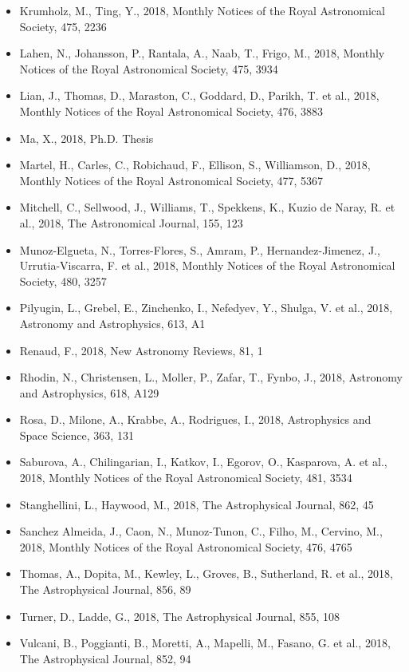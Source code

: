 \documentclass{letter}
\begin{document}
\begin{enumerate}
\begin{itemize}
\item Krumholz, M., Ting, Y., 2018, Monthly Notices of the Royal Astronomical Society, 475, 2236
\item Lahen, N., Johansson, P., Rantala, A., Naab, T., Frigo, M., 2018, Monthly Notices of the Royal Astronomical Society, 475, 3934
\item Lian, J., Thomas, D., Maraston, C., Goddard, D., Parikh, T. et al., 2018, Monthly Notices of the Royal Astronomical Society, 476, 3883
\item Ma, X., 2018, Ph.D. Thesis
\item Martel, H., Carles, C., Robichaud, F., Ellison, S., Williamson, D., 2018, Monthly Notices of the Royal Astronomical Society, 477, 5367
\item Mitchell, C., Sellwood, J., Williams, T., Spekkens, K., Kuzio de Naray, R. et al., 2018, The Astronomical Journal, 155, 123
\item Munoz-Elgueta, N., Torres-Flores, S., Amram, P., Hernandez-Jimenez, J., Urrutia-Viscarra, F. et al., 2018, Monthly Notices of the Royal Astronomical Society, 480, 3257
\item Pilyugin, L., Grebel, E., Zinchenko, I., Nefedyev, Y., Shulga, V. et al., 2018, Astronomy and Astrophysics, 613, A1
\item Renaud, F., 2018, New Astronomy Reviews, 81, 1
\item Rhodin, N., Christensen, L., Moller, P., Zafar, T., Fynbo, J., 2018, Astronomy and Astrophysics, 618, A129
\item Rosa, D., Milone, A., Krabbe, A., Rodrigues, I., 2018, Astrophysics and Space Science, 363, 131
\item Saburova, A., Chilingarian, I., Katkov, I., Egorov, O., Kasparova, A. et al., 2018, Monthly Notices of the Royal Astronomical Society, 481, 3534
\item Stanghellini, L., Haywood, M., 2018, The Astrophysical Journal, 862, 45
\item Sanchez Almeida, J., Caon, N., Munoz-Tunon, C., Filho, M., Cervino, M., 2018, Monthly Notices of the Royal Astronomical Society, 476, 4765
\item Thomas, A., Dopita, M., Kewley, L., Groves, B., Sutherland, R. et al., 2018, The Astrophysical Journal, 856, 89
\item Turner, D., Ladde, G., 2018, The Astrophysical Journal, 855, 108
\item Vulcani, B., Poggianti, B., Moretti, A., Mapelli, M., Fasano, G. et al., 2018, The Astrophysical Journal, 852, 94

\end{itemize}
\end{enumerate}
\end{document}
